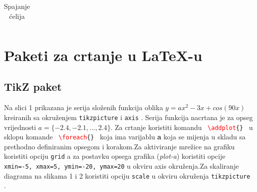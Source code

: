 \documentclass[letter paper]{article}
\begin{document}
\begin{table}[h]
\begin{minipage}[b]{0.33\textwidth}
\begin{tabular} {|l|c|r|}
\end{tabular}
\caption{Spajanje ćelija}
\label{tabela:tab3}
\end{minipage}
\end{table}

\begin{center}

\end{center}

\newpage


\section{Paketi za crtanje u \LaTeX-u}

\subsection{TikZ paket}

Na slici 1 prikazana je serija složenih funkcija oblika $y=ax^2-3x+cos(90x)$ kreiranih sa okruženjem \texttt{\color{blue}tikzpicture} \color{black}i \texttt{\color{blue}axis} \color{black}. Serija funkcija nacrtana je za opseg vrijednosti $a=\{-2.4,-2.1,...,2.4\}$. Za crtanje  koristiti komandu \texttt{ \textcolor{red}{\textbackslash addplot}\{\} } u sklopu komande \texttt{ \textcolor{red}{\textbackslash foreach}\{\} } koja ima varijablu \textbf{a} koja se mijenja u skladu sa prethodno definiranim opsegom i korakom.Za aktiviranje mrežice na grafiku koristiti opciju \texttt{grid} a za postavku opsega grafika (\textit{plot-a}) koristiti opcije \texttt{xmin=-5, xmax=5, ymin=-20, ymax=20} u okviru \color{blue}axis \color{black} okruženja.Za skaliranje diagrama na slikama 1 i 2 koristiti opciju \texttt{scale} u okviru okruženja \color{blue}\texttt{tikzpicture} \color{black}.
\end{document}
